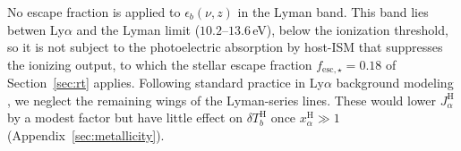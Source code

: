 \documentclass[apj,twocolumn, appendixfloats, twocolappendix, numberedappendix, tighten]{openjournal}
\DeclareRobustCommand{\lumina}{\mbox{\textsc{lumina}}\xspace}
\begin{document}
\begin{appendix}


No escape fraction is applied to $\epsilon_b(\nu,z)$ in the  Lyman band. This band lies betwen Ly$\alpha$ and the Lyman limit ($10.2$--$13.6$\,eV), below the  ionization threshold, so it is not subject to the photoelectric absorption by host-ISM  that suppresses the ionizing output, to which the stellar escape fraction $f_\mathrm{esc,\star} = 0.18$ of Section~\ref{sec:rt} applies. Following standard practice in Ly$\alpha$ background modeling \citep[e.g.][]{Barkana2005, Mesinger2011}, we neglect the remaining wings of the Lyman-series lines. These would lower $J_\alpha^{\mathrm{H}}$ by a modest factor but have little effect on $\delta T_b^{\mathrm{H}}$ once $x_\alpha^{\mathrm{H}} \gg 1$ (Appendix~\ref{sec:metallicity}).



\end{appendix}
\end{document}
